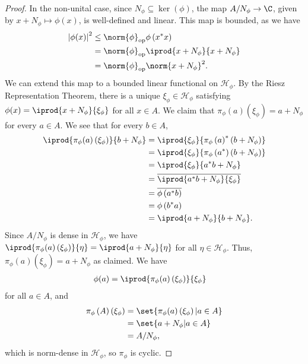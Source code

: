 \documentclass[10pt]{mypackage}
\DeclareMathOperator{\op}{op}
\begin{document}
\begin{proof}
  In the non-unital case, since $N_{\phi}\subseteq \ker\left(\phi\right)$, the map $A/N_{\phi}\rightarrow \C$, given by $x + N_{\phi}\mapsto \phi(x)$, is well-defined and linear. This map is bounded, as we have
  \begin{align*}
    \left\vert \phi(x) \right\vert^2 &\leq \norm{\phi}_{\op}\phi\left(x^{\ast}x\right)\\
                                     &= \norm{\phi}_{\op} \iprod{x + N_{\phi}}{x + N_{\phi}}\\
                                     &= \norm{\phi}_{\op}\norm{x + N_{\phi}}^2.
  \end{align*}
  We can extend this map to a bounded linear functional on $\mathcal{H}_{\phi}$. By the Riesz Representation Theorem, there is a unique $\xi_{\phi}\in \mathcal{H}_{\phi}$ satisfying $\phi(x) = \iprod{x + N_{\phi}}{\xi_{\phi}}$ for all $x\in A$. We claim that $\pi_{\phi}(a)\left(\xi_{\phi}\right) = a + N_{\phi}$ for every $a\in A$. We see that for every $b\in A$,
  \begin{align*}
    \iprod{\pi_{\phi}(a)\left(\xi_{\phi}\right)}{b + N_{\phi}} &= \iprod{\xi_{\phi}}{\pi_{\phi}\left(a\right)^{\ast}\left(b + N_{\phi}\right)}\\
                                                               &= \iprod{\xi_{\phi}}{\pi_{\phi}\left(a^{\ast}\right)\left(b + N_{\phi}\right)}\\
                                                               &= \iprod{\xi_{\phi}}{a^{\ast}b + N_{\phi}}\\
                                                               &= \overline{ \iprod{a^{\ast}b + N_{\phi}}{\xi_{\phi}} }\\
                                                               &= \overline{\phi\left(a^{\ast}b\right)}\\
                                                               &= \phi\left(b^{\ast}a\right)\\
                                                               &= \iprod{a + N_{\phi}}{ b + N_{\phi} }.
  \end{align*}
  Since $A/N_{\phi}$ is dense in $\mathcal{H}_{\phi}$, we have $ \iprod{\pi_{\phi}(a)\left(\xi_{\phi}\right)}{\eta} = \iprod{a + N_{\phi}}{\eta} $ for all $\eta\in \mathcal{H}_{\phi}$. Thus, $\pi_{\phi}(a)\left(\xi_{\phi}\right) = a + N_{\phi}$ as claimed. We have
  \begin{align*}
    \phi(a) &= \iprod{\pi_{\phi}(a)\left(\xi_{\phi}\right)}{\xi_{\phi}}
  \end{align*}
  for all $a\in A$, and
  \begin{align*}
    \pi_{\phi}\left(A\right)\left(\xi_{\phi}\right) &= \set{\pi_{\phi}(a)\left(\xi_{\phi}\right) | a\in A}\\
                                                    &= \set{a + N_{\phi} | a\in A}\\
                                                    &= A/N_{\phi},
  \end{align*}
  which is norm-dense in $\mathcal{H}_{\phi}$, so $\pi_{\phi}$ is cyclic.\newline


\end{proof}
\end{document}
